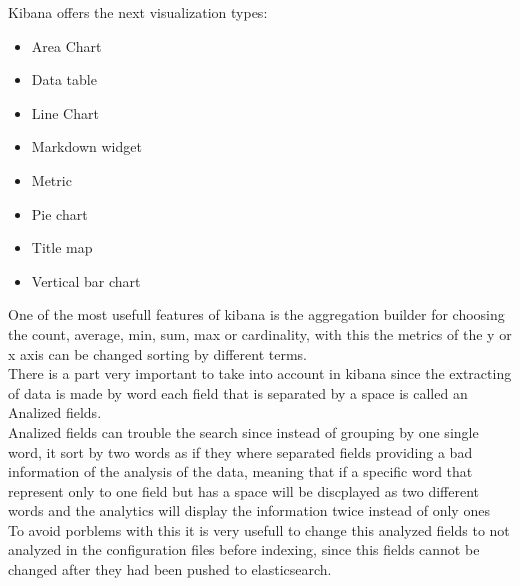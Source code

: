 Kibana offers the next visualization types:
\begin{itemize}
\item Area Chart
\item Data table
\item Line Chart
\item Markdown widget
\item Metric
\item Pie chart
\item Title map
\item Vertical bar chart
\end{itemize}

One of the most usefull features of kibana is the aggregation builder for choosing the count, average, min, sum, max or cardinality, with this the metrics of the y or x axis can be changed sorting by different terms.
\\

There is a part very important to take into account in kibana since the extracting of data is made by word each field that is separated by a space is called an Analized fields. 
\\

Analized fields can trouble the search since instead of grouping by one single word, it sort by two words as if they where separated fields providing a bad information of the analysis of the data, meaning that if a specific word that represent only to one field but has a space will be discplayed as two different words and the analytics will display the information twice instead of only ones
\\

To avoid porblems with this it is very usefull to change this analyzed fields to not analyzed in the configuration files before indexing, since this fields cannot be changed after they had been pushed to elasticsearch.
